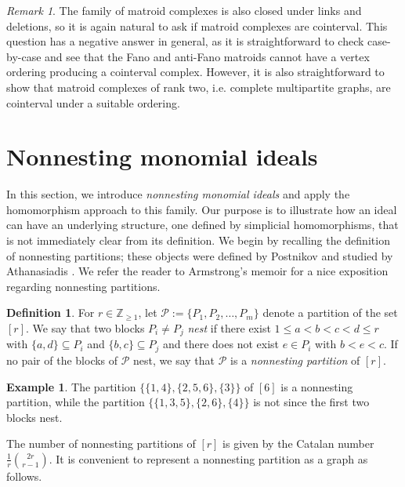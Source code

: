 \documentclass[11pt]{amsart}
\theoremstyle{definition}
\newtheorem{definition}[theorem]{Definition}
\newtheorem{example}[theorem]{Example}
\numberwithin{equation}{section}
\theoremstyle{remark}
\newtheorem{remark}[theorem]{Remark}
\numberwithin{equation}{section}
\begin{document}
\begin{remark}
The family of matroid complexes is also closed under links and deletions, so it is again natural to ask if matroid complexes are cointerval.  
This question has a negative answer in general, as it is straightforward to check case-by-case and see that the Fano and anti-Fano matroids cannot have a vertex ordering producing a cointerval complex.
However, it is also straightforward to show that matroid complexes of rank two, i.e. complete multipartite graphs, are cointerval under a suitable ordering.
\end{remark}

\section{Nonnesting monomial ideals}\label{families}

In this section, we introduce \emph{nonnesting monomial ideals} and apply the homomorphism approach to this family.
Our purpose is to illustrate how an ideal can have an underlying structure, one defined by simplicial homomorphisms, that is not immediately clear from its definition.
We begin by recalling the definition of nonnesting partitions; these objects were defined by Postnikov and studied by Athanasiadis \cite{AthanasiadisNonnesting}.
We refer the reader to Armstrong's memoir \cite[Chapter 5]{ArmstrongMemoir} for a nice exposition regarding nonnesting partitions.

\begin{definition}
For $r\in \mathbb{Z}_{\geq 1}$, let ${\mathcal{P}}:=\{P_1,P_2,\ldots,P_m\}$ denote a partition of the set $[r]$.
We say that two blocks $P_i\neq P_j$ \emph{nest} if there exist $1\leq a<b<c<d\leq r$ with $\{a,d\}\subseteq P_i$ and $\{b,c\}\subseteq P_j$ and there does not exist $e\in P_i$ with $b<e<c$.
If no pair of the blocks of ${\mathcal{P}}$ nest, we say that ${\mathcal{P}}$ is a \emph{nonnesting partition} of $[r]$.
\end{definition}

\begin{example}
The partition $\{\{1,4\},\{2,5,6\},\{3\}\}$ of $[6]$ is a nonnesting partition, while the partition $\{\{1,3,5\},\{2,6\},\{4\}\}$ is not since the first two blocks nest.
\end{example}

The number of nonnesting partitions of $[r]$ is given by the Catalan number $\frac{1}{r}\binom{2r}{r-1}$.
It is convenient to represent a nonnesting partition as a graph as follows.
\end{document}
